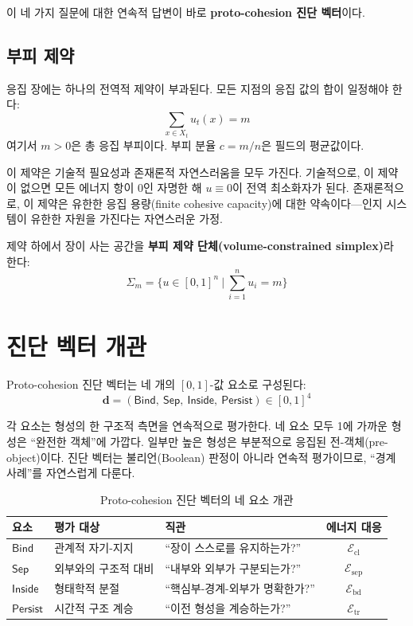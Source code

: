 이 네 가지 질문에 대한 연속적 답변이 바로 \textbf{proto-cohesion 진단 벡터}이다.


\subsection{부피 제약}

응집 장에는 하나의 전역적 제약이 부과된다. 모든 지점의 응집 값의 합이 일정해야 한다:
\begin{equation}
    \sum_{x \in X_t} u_t(x) = m
    \label{eq:volume-constraint}
\end{equation}
여기서 $m > 0$은 총 응집 부피이다. 부피 분율 $c = m/n$은 필드의 평균값이다.

이 제약은 기술적 필요성과 존재론적 자연스러움을 모두 가진다. 기술적으로, 이 제약이 없으면 모든 에너지 항이 0인 자명한 해 $u \equiv 0$이 전역 최소화자가 된다. 존재론적으로, 이 제약은 유한한 응집 용량(finite cohesive capacity)에 대한 약속이다---인지 시스템이 유한한 자원을 가진다는 자연스러운 가정.

제약 하에서 장이 사는 공간을 \textbf{부피 제약 단체(volume-constrained simplex)}라 한다:
\begin{equation}
    \Sigma_m = \Big\{u \in [0,1]^n\ \Big|\ \sum_{i=1}^n u_i = m\Big\}
    \label{eq:simplex}
\end{equation}


\section{진단 벡터 개관}
\label{sec:diagnostic-overview}

Proto-cohesion 진단 벡터는 네 개의 $[0,1]$-값 요소로 구성된다:
\begin{equation}
    \boxed{\mathbf{d} = (\mathsf{Bind},\ \mathsf{Sep},\ \mathsf{Inside},\ \mathsf{Persist}) \in [0,1]^4}
    \label{eq:diagnostic-vector}
\end{equation}

각 요소는 형성의 한 구조적 측면을 연속적으로 평가한다. 네 요소 모두 1에 가까운 형성은 ``완전한 객체''에 가깝다. 일부만 높은 형성은 부분적으로 응집된 전-객체(pre-object)이다. 진단 벡터는 불리언(Boolean) 판정이 아니라 연속적 평가이므로, ``경계 사례''를 자연스럽게 다룬다.

\begin{table}[t]
\centering
\caption{Proto-cohesion 진단 벡터의 네 요소 개관}
\label{tab:diagnostic-overview}
\begin{tabular}{lllc}
\hline
\textbf{요소} & \textbf{평가 대상} & \textbf{직관} & \textbf{에너지 대응} \\
\hline
$\mathsf{Bind}$ & 관계적 자기-지지 & ``장이 스스로를 유지하는가?'' & $\mathcal{E}_{\mathrm{cl}}$ \\
$\mathsf{Sep}$  & 외부와의 구조적 대비 & ``내부와 외부가 구분되는가?'' & $\mathcal{E}_{\mathrm{sep}}$ \\
$\mathsf{Inside}$ & 형태학적 분절 & ``핵심부-경계-외부가 명확한가?'' & $\mathcal{E}_{\mathrm{bd}}$ \\
$\mathsf{Persist}$ & 시간적 구조 계승 & ``이전 형성을 계승하는가?'' & $\mathcal{E}_{\mathrm{tr}}$ \\
\hline
\end{tabular}
\end{table}


